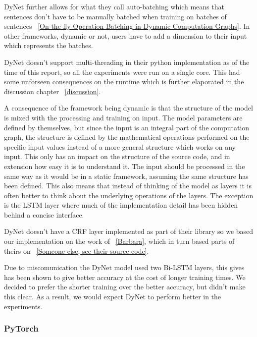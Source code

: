 DyNet further allows for what they call auto-batching which means that sentences
don't have to be manually batched when training on batches of sentences
~\ref{On-the-fly Operation Batching in Dynamic Computation Graphs}. In other
frameworks, dynamic or not, users have to add a dimension to their input which
represents the batches.

DyNet doesn't support multi-threading in their python implementation as of the
time of this report, so all the experiments were run on a single core. This had
some unforseen consequences on the runtime which is further elaporated in the
discussion chapter ~\ref{discussion}.

A consequence of the framework being dynamic is that the structure of the model
is mixed with the processing and training on input. The model parameters are
defined by themselves, but since the input is an integral part of the
computation graph, the structure is defined by the mathematical operations
performed on the specific input values instead of a more general structure which
works on any input. This only has an impact on the structure of the source code,
and in extension how easy it is to understand it. The input should be processed
in the same way as it would be in a static framework, assuming the same
structure has been defined. This also means that instead of thinking of the
model as layers it is often better to think about the underlying operations of
the layers. The exception is the LSTM layer where much of the
implementation detail has been hidden behind a concise interface.

DyNet doesn't have a CRF layer implemented as part of their library so we based
our implementation on the work of ~\ref{Barbara}, which in turn based parts of
theirs on ~\ref{Someone else, see their source code}. 

Due to miscomunication the DyNet model used two Bi-LSTM layers, this gives has
been shown to give better accuracy at the cost of longer training times. We
decided to prefer the shorter training over the better accuracy, but didn't make
this clear. As a result, we would expect DyNet to perform better in the
experiments.



\subsubsection*{PyTorch}


